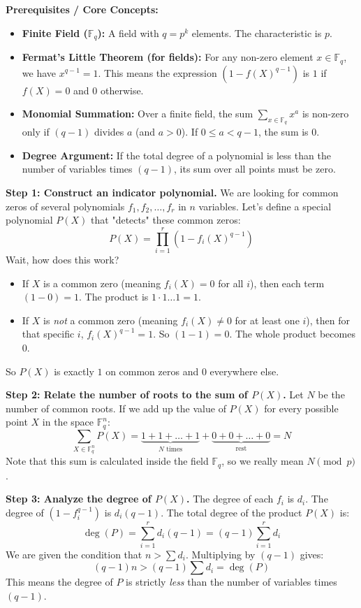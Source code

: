 \begin{solution}
\textbf{Prerequisites / Core Concepts:}
\begin{itemize}
    \item \textbf{Finite Field ($\mathbb{F}_q$):} A field with $q = p^k$ elements. The characteristic is $p$.
    \item \textbf{Fermat's Little Theorem (for fields):} For any non-zero element $x \in \mathbb{F}_q$, we have $x^{q-1} = 1$. This means the expression $(1 - f(X)^{q-1})$ is $1$ if $f(X)=0$ and $0$ otherwise.
    \item \textbf{Monomial Summation:} Over a finite field, the sum $\sum_{x \in \mathbb{F}_q} x^a$ is non-zero only if $(q-1)$ divides $a$ (and $a > 0$). If $0 \leq a < q-1$, the sum is $0$.
    \item \textbf{Degree Argument:} If the total degree of a polynomial is less than the number of variables times $(q-1)$, its sum over all points must be zero.
\end{itemize}

\textbf{Step 1: Construct an indicator polynomial.}
We are looking for common zeros of several polynomials $f_1, f_2, \dots, f_r$ in $n$ variables.
Let's define a special polynomial $P(X)$ that "detects" these common zeros:
\[ P(X) = \prod_{i=1}^r \left(1 - f_i(X)^{q-1}\right) \]
Wait, how does this work?
\begin{itemize}
    \item If $X$ is a common zero (meaning $f_i(X) = 0$ for all $i$), then each term $(1-0) = 1$. The product is $1 \cdot 1 \dots 1 = 1$.
    \item If $X$ is \textit{not} a common zero (meaning $f_i(X) \neq 0$ for at least one $i$), then for that specific $i$, $f_i(X)^{q-1} = 1$. So $(1-1) = 0$. The whole product becomes $0$.
\end{itemize}
So $P(X)$ is exactly $1$ on common zeros and $0$ everywhere else.

\textbf{Step 2: Relate the number of roots to the sum of $P(X)$.}
Let $N$ be the number of common roots. If we add up the value of $P(X)$ for every possible point $X$ in the space $\mathbb{F}_q^n$:
\[ \sum_{X \in \mathbb{F}_q^n} P(X) = \underbrace{1 + 1 + \dots + 1}_{N \text{ times}} + \underbrace{0 + 0 + \dots + 0}_{\text{rest}} = N \]
Note that this sum is calculated inside the field $\mathbb{F}_q$, so we really mean $N \pmod p$.

\textbf{Step 3: Analyze the degree of $P(X)$.}
The degree of each $f_i$ is $d_i$. The degree of $(1 - f_i^{q-1})$ is $d_i(q-1)$.
The total degree of the product $P(X)$ is:
\[ \deg(P) = \sum_{i=1}^r d_i(q-1) = (q-1) \sum_{i=1}^r d_i \]
We are given the condition that $n > \sum d_i$. Multiplying by $(q-1)$ gives:
\[ (q-1)n > (q-1) \sum d_i = \deg(P) \]
This means the degree of $P$ is strictly \textit{less} than the number of variables times $(q-1)$.


\end{solution}
